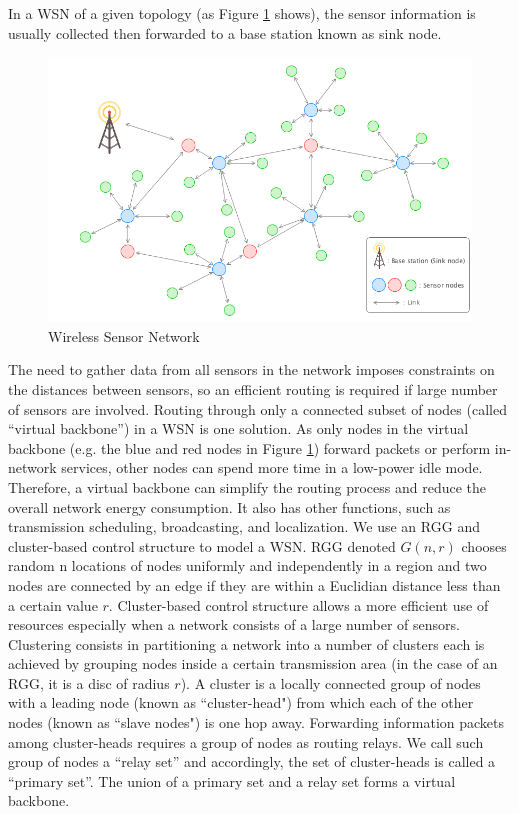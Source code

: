 \documentclass[11pt]{amsart}
\begin{document}
In a \ac{WSN} of a given topology (as Figure \ref{fig:wsn} shows), the sensor information is usually collected then forwarded to a base station known as sink node.
\begin{figure}[htp]
	\centering
	\includegraphics[width=.8\linewidth]{images/WSN.png}
	\caption{Wireless Sensor Network}
	\label{fig:wsn}
\end{figure}
The need to gather data from all sensors in the network imposes constraints on the distances between sensors, so an efficient routing is required if large number of sensors are involved. Routing through only a connected subset of nodes (called ``virtual backbone”) in a WSN is one solution\cite{al2008efficient,mahjoub2009experimental,chen2017bipartite}. As only nodes in the virtual backbone (e.g. the blue and red nodes in Figure \ref{fig:wsn}) forward packets or perform in-network services, other nodes can spend more time in a low-power idle mode. Therefore, a virtual backbone can simplify the routing process and reduce the overall network energy consumption. It also has other functions, such as transmission scheduling, broadcasting, and localization\cite{wang2005distributed}. We use an \ac{RGG} and cluster-based control structure to model a \ac{WSN}. \ac{RGG} denoted $G(n,r)$ chooses random n locations of nodes uniformly and independently in a region and two nodes are connected by an edge if they are within a Euclidian distance less than a certain value $r$\cite{dall2002random}. Cluster-based control structure allows a more efficient use of resources especially when a network consists of a large number of sensors\cite{carlos2016wireless}. Clustering consists in partitioning a network into a number of clusters each is achieved by grouping nodes inside a certain transmission area (in the case of an \ac{RGG}, it is a disc of radius $r$). A cluster is a locally connected group of nodes with a leading node (known as ``cluster-head") from which each of the other nodes (known as ``slave nodes") is one hop away. Forwarding information packets among cluster-heads requires a group of nodes as routing relays. We call such group of nodes a ``relay set” and accordingly, the set of cluster-heads is called a ``primary set”. The union of a primary set and a relay set forms a virtual backbone.
\end{document}
